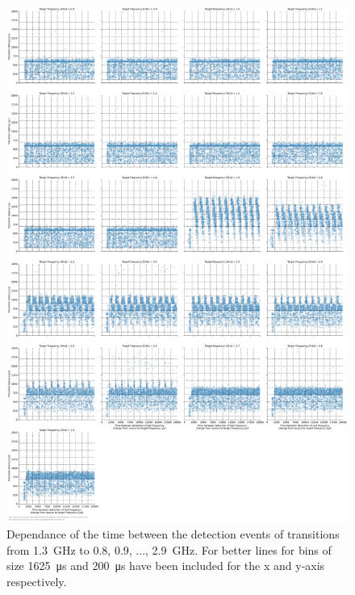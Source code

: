 \begin{figure}[]
    \centering
    \includegraphics[width=\columnwidth]{fig/ftalat/ftalat_scatter_wait_transition_latency_hati_source_1.3.pdf}
    \caption{Dependance of the time between the detection events of transitions from \SI{1.3}{\GHz} to \SI{0.8}{}, \SI{0.9}{}, ..., \SI{2.9}{\GHz}. For better lines for bins of size \SI{1625}{\us} and \SI{200}{\us} have been included for the x and y-axis respectively.}
\end{figure}
